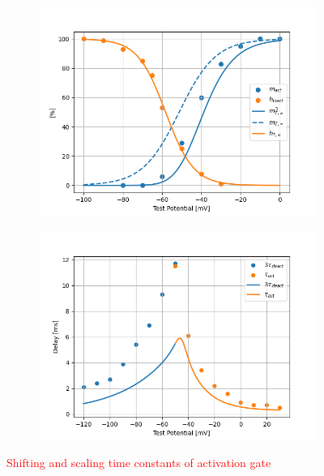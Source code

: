 \documentclass[../../workflow.tex]{subfiles}
\begin{document}
\begin{figure}[H]
    \centering
    \begin{subfigure}[t]{0.45\textwidth}
        \centering
        \includegraphics[width=\textwidth]{./img/t_type_calcium_channel/simulations/Scaling/Constant Field Equation1_steady_state_activation_inactivation.png}
        \caption{}
        \label{fig_r5_t_type_steady_state_activation_shifted}
    \end{subfigure}
    \hfill
    \begin{subfigure}[t]{0.45\textwidth}
        \centering
        \includegraphics[width=\textwidth]{./img/t_type_calcium_channel/simulations/Scaling/Constant Field Equation2_tau_m.png}
        \caption{}
        \label{fig_r5_t_type_tau_activation_scaled}
    \end{subfigure}
    
    \caption{\textcolor{red}{Shifting and scaling time constants of activation gate}}
    \label{fig_r5_t_type_shifting_scaling}
\end{figure}
\end{document}
